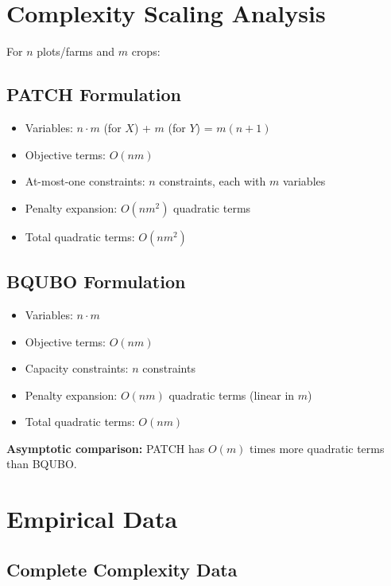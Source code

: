 \documentclass[11pt,a4paper]{article}
\begin{document}
\appendix

\section{Complexity Scaling Analysis}

For $n$ plots/farms and $m$ crops:

\subsection{PATCH Formulation}
\begin{itemize}
    \item Variables: $n \cdot m$ (for $X$) + $m$ (for $Y$) = $m(n+1)$
    \item Objective terms: $O(nm)$
    \item At-most-one constraints: $n$ constraints, each with $m$ variables
    \item Penalty expansion: $O(nm^2)$ quadratic terms
    \item Total quadratic terms: $O(nm^2)$
\end{itemize}

\subsection{BQUBO Formulation}
\begin{itemize}
    \item Variables: $n \cdot m$
    \item Objective terms: $O(nm)$
    \item Capacity constraints: $n$ constraints
    \item Penalty expansion: $O(nm)$ quadratic terms (linear in $m$)
    \item Total quadratic terms: $O(nm)$
\end{itemize}

\textbf{Asymptotic comparison:} PATCH has $O(m)$ times more quadratic terms than BQUBO.

\section{Empirical Data}

\subsection{Complete Complexity Data}
\end{document}
